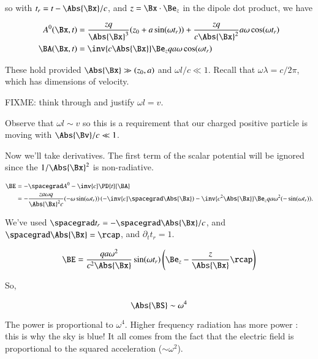 so with $t_r = t - \Abs{\Bx}/c$, and $z = \Bx \cdot \Be_z$ in the dipole dot product, we have

\begin{align}\label{eqn:relativisticElectrodynamicsL20:400}
A^0(\Bx, t) &= 
\frac{z q}{\Abs{\Bx}^3} ( z_0 + a \sin(\omega t_r) ) + \frac{z q}{c \Abs{\Bx}^2} a \omega \cos(\omega t_r) \\
\BA(\Bx, t) &= \inv{c \Abs{\Bx} } \Be_z q a \omega \cos(\omega t_r)
\end{align}

These hold provided $\Abs{\Bx} \gg (z_0, a)$ and $\omega l/c \ll 1$.  Recall that $\omega \lambda = c/2\pi$, which has dimensions of velocity.

FIXME: think through and justify $\omega l = v$.

Observe that $\omega l \sim v$ so this is a requirement that our charged positive particle is moving with $\Abs{\Bv}/c \ll 1$.

Now we'll take derivatives.  The first term of the scalar potential will be ignored since the $1/\Abs{\Bx}^2$ is non-radiative.

\begin{align*}
\BE 
&= -\spacegrad A^0 - \inv{c} \PD{t}{\BA} \\
&= -\frac{z a \omega q}{\Abs{\Bx}^2 c} (-\omega \sin(\omega t_r)) \left( - \inv{c} \spacegrad \Abs{\Bx} \right)
- \inv{c^2 \Abs{\Bx} } \Be_z q a \omega^2 (-\sin(\omega t_r)).
\end{align*}

We've used $\spacegrad t_r = -\spacegrad \Abs{\Bx}/c$, and $\spacegrad \Abs{\Bx} = \rcap$, and $\partial_t t_r = 1$.

\begin{equation}\label{eqn:relativisticElectrodynamicsL20:420}
\BE = \frac{ q a \omega^2 }{c^2 \Abs{\Bx} } \sin(\omega t_r) \left( \Be_z - \frac{z}{\Abs{\Bx} } \rcap \right)
\end{equation}

So,

\begin{equation}\label{eqn:relativisticElectrodynamicsL20:440}
\Abs{\BS} \sim \omega^4
\end{equation}

The power is proportional to $\omega^4$.  Higher frequency radiation has more power : this is why the sky is blue!  It all comes from the fact that the electric field is proportional to the squared acceleration ($\sim \omega^2$).

\EndArticle
